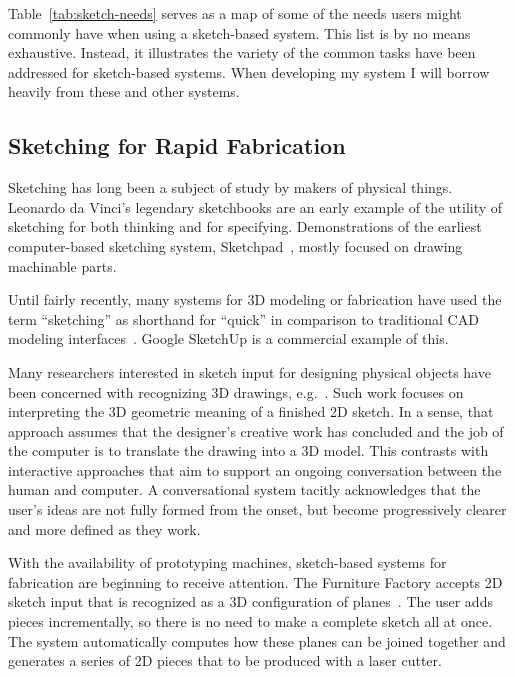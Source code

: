 \documentclass[11pt]{article}
\begin{document}
Table~\ref{tab:sketch-needs} serves as a map of some of the needs
users might commonly have when using a sketch-based system. This list
is by no means exhaustive. Instead, it illustrates the variety of the
common tasks have been addressed for sketch-based systems. When
developing my system I will borrow heavily from these and other
systems.

\subsection{Sketching for Rapid Fabrication}

Sketching has long been a subject of study by makers of physical
things. Leonardo da Vinci's legendary sketchbooks are an early example
of the utility of sketching for both thinking and for
specifying. Demonstrations of the earliest computer-based sketching
system, Sketchpad~\cite{sutherland-sketchpad}, mostly focused on
drawing machinable parts.

Until fairly recently, many systems for 3D modeling or fabrication
have used the term ``sketching'' as shorthand for ``quick'' in
comparison to traditional CAD modeling
interfaces~\cite{bloomenthal-sketch-n-make,pugh-thesis-viking,zeleznik-sketch}. Google
SketchUp is a commercial example of this.

Many researchers interested in sketch input for designing physical
objects have been concerned with recognizing 3D drawings,
e.g.~\cite{lipson-correlation,masry-3d-sketch}. Such work focuses on
interpreting the 3D geometric meaning of a finished 2D sketch. In a
sense, that approach assumes that the designer's creative work has
concluded and the job of the computer is to translate the drawing into
a 3D model. This contrasts with interactive approaches that aim to
support an ongoing conversation between the human and computer. A
conversational system tacitly acknowledges that the user's ideas are
not fully formed from the onset, but become progressively clearer and
more defined as they work.

With the availability of prototyping machines, sketch-based systems
for fabrication are beginning to receive attention. The Furniture
Factory accepts 2D sketch input that is recognized as a 3D
configuration of planes~\cite{oh-fab}. The user adds pieces
incrementally, so there is no need to make a complete sketch all at
once. The system automatically computes how these planes can be joined
together and generates a series of 2D pieces that to be produced with
a laser cutter.
\end{document}
